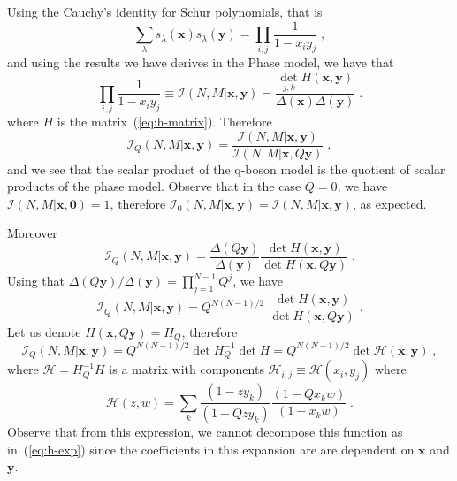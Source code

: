 \documentclass[a4paper,11pt]{amsart}
\begin{document}
Using the Cauchy's identity for Schur polynomials, that is 
\begin{equation}
  \sum_\lambda s_\lambda(\bm{x}) s_\lambda(\bm{y}) = \prod_{i,j} \frac{1}{1 - x_i y_j}\; ,
\end{equation}
and using the results we have derives in the Phase model, we have that 
\begin{equation}
  \prod_{i,j}\frac{1}{1 - x_i y_j}  \equiv \mathcal{I}(N,M|\bm{x}, \bm{y}) = 
  \frac{\det_{j,k}H(\bm{x},\bm{y})}{\Delta(\bm{x}) \Delta(\bm{y})}\; .
\end{equation}
where \(H\) is the matrix~(\ref{eq:h-matrix}). Therefore
\begin{equation}
  \mathcal{I}_Q(N,M | \bm{x}, \bm{y})  
= \frac{\mathcal{I}(N,M|\bm{x}, \bm{y})}{\mathcal{I}(N,M|\bm{x}, Q\bm{y})}\; , 
\end{equation}
and we see that the scalar product of the q-boson model is the quotient of 
scalar products of the phase model. Observe that in the case \(Q = 0\), we have 
\(\mathcal{I}(N, M| \bm{x}, \bm{0}) = 1\), therefore
\(\mathcal{I}_0(N,M | \bm{x}, \bm{y}) = \mathcal{I}(N,M | \bm{x}, \bm{y})\), 
as expected. 

Moreover
\begin{equation}
  \mathcal{I}_Q(N,M | \bm{x}, \bm{y})  
  = \frac{\Delta(Q\bm{y})}{\Delta(\bm{y})}
  \frac{\det H(\bm{x}, \bm{y})}{\det H(\bm{x},Q \bm{y})} \; .
\end{equation}
Using that \(\Delta(Q\bm{y})/ \Delta(\bm{y}) = \prod_{j=1}^{N-1} Q^j\), we have 
\begin{equation}
  \mathcal{I}_Q(N,M | \bm{x}, \bm{y}) =  Q^{N(N-1)/2}\;
  \frac{\det H(\bm{x}, \bm{y})}{\det H(\bm{x}, Q \bm{y})} \; .
\end{equation}
Let us denote \(H(\bm{x}, Q\bm{y}) = H_{Q}\), therefore
\begin{equation}
  \mathcal{I}_Q(N,M | \bm{x}, \bm{y}) = Q^{N(N-1)/2} \det H_{Q}^{-1} \det H
= Q^{N(N-1)/2} \det \mathcal{H}(\bm{x}, \bm{y}) \; ,
\end{equation}
where \(\mathcal{H} = H_{Q}^{-1} H\) is a matrix with components 
\(\mathcal{H}_{i,j} \equiv \mathcal{H}(x_i, y_j)\) where
\begin{equation}
  \mathcal{H}(z, w) = \sum_{k} \frac{(1 - z y_k)}{(1 - Q z y_k)} 
\frac{(1 - Q x_k w)}{(1 - x_k w)}\; .
\end{equation}
Observe that from this expression, we cannot decompose this function
as in~(\ref{eq:h-exp}) since the coefficients in this expansion are 
are dependent on \(\bm{x}\) and \(\bm{y}\).
\end{document}
